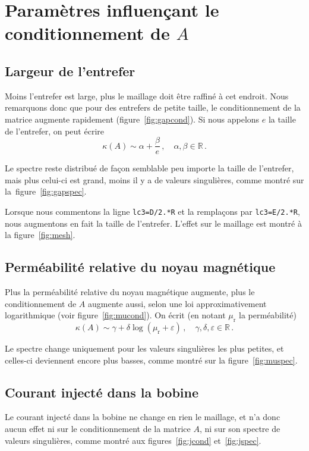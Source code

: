 \documentclass[11pt]{article}
\begin{document}
\section{Paramètres influençant le conditionnement de $A$}
\label{param}
\subsection{Largeur de l'entrefer}
Moins l'entrefer est large, plus le maillage doit être raffiné à cet endroit.
Nous remarquons donc que pour des entrefers de petite taille,
le conditionnement de la matrice augmente rapidement (figure~\ref{fig:gapcond}).
Si nous appelons $e$ la taille de l'entrefer, on peut écrire
\[
\kappa(A) \sim \alpha + \frac{\beta}{e}\,, \quad \alpha, \beta \in \mathbb{R}\,.
\]

Le spectre reste distribué de façon semblable peu importe la taille de l'entrefer,
mais plus celui-ci est grand, moins il y a de valeurs singulières, comme montré sur la figure~\ref{fig:gapspec}.

Lorsque nous commentons la ligne \texttt{lc3=D/2.*R} et la remplaçons par \texttt{lc3=E/2.*R}, nous augmentons en fait la taille de l'entrefer.
L'effet sur le maillage est montré à la figure~\ref{fig:mesh}.

\subsection{Perméabilité relative du noyau magnétique}
Plus la perméabilité relative du noyau magnétique augmente,
plus le conditionnement de $A$ augmente aussi, selon une loi approximativement logarithmique (voir figure~\ref{fig:mucond}). On écrit (en notant $\mu_{\mathrm{r}}$ la perméabilité)
\[
\kappa(A) \sim \gamma + \delta \log(\mu_{\mathrm{r}} + \varepsilon)\,, \quad \gamma, \delta, \varepsilon \in \mathbb{R}\,. 
\]

Le spectre change uniquement pour les valeurs singulières les plus petites,
et celles-ci deviennent encore plus basses, comme montré sur la figure~\ref{fig:muspec}.

\subsection{Courant injecté dans la bobine}
Le courant injecté dans la bobine ne change en rien le maillage,
et n'a donc aucun effet ni sur le conditionnement de la matrice $A$,
ni sur son spectre de valeurs singulières,
comme montré aux figures~\ref{fig:jcond} et~\ref{fig:jspec}.
\end{document}
